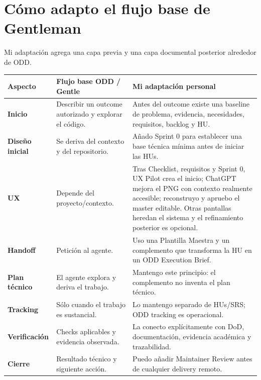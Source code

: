 \documentclass[11pt,a4paper]{article}
\begin{document}
\section{Cómo adapto el flujo base de Gentleman}

Mi adaptación agrega una capa previa y una capa documental posterior alrededor de ODD.

\begin{tabularx}{\textwidth}{>{\bfseries}p{}XX}
\toprule
Aspecto & Flujo base ODD / Gentle & Mi adaptación personal \\
\midrule
Inicio &
Describir un outcome autorizado y explorar el código. &
Antes del outcome existe una baseline de problema, evidencia, necesidades, requisitos, backlog y HU. \\

Diseño inicial &
Se deriva del contexto y del repositorio. &
Añado Sprint 0 para establecer una base técnica mínima antes de iniciar las HUs. \\

UX &
Depende del proyecto/contexto. &
Tras Checklist, requisitos y Sprint 0, UX Pilot crea el inicio; ChatGPT mejora el PNG con contexto realmente accesible; reconstruyo y apruebo el master editable. Otras pantallas heredan el sistema y el refinamiento posterior es opcional. \\

Handoff &
Petición al agente. &
Uso una Plantilla Maestra y un complemento que transforma la HU en un ODD Execution Brief. \\

Plan técnico &
El agente explora y deriva el trabajo. &
Mantengo este principio: el complemento no inventa el plan técnico. \\

Tracking &
Sólo cuando el trabajo es sustancial. &
Lo mantengo separado de HUs/SRS; ODD tracking es operacional. \\

Verificación &
Checks aplicables y evidencia observada. &
La conecto explícitamente con DoD, documentación, evidencia académica y trazabilidad. \\

Cierre &
Resultado técnico y siguiente acción. &
Puedo añadir Maintainer Review antes de cualquier delivery remoto. \\
\bottomrule
\end{tabularx}
\end{document}
